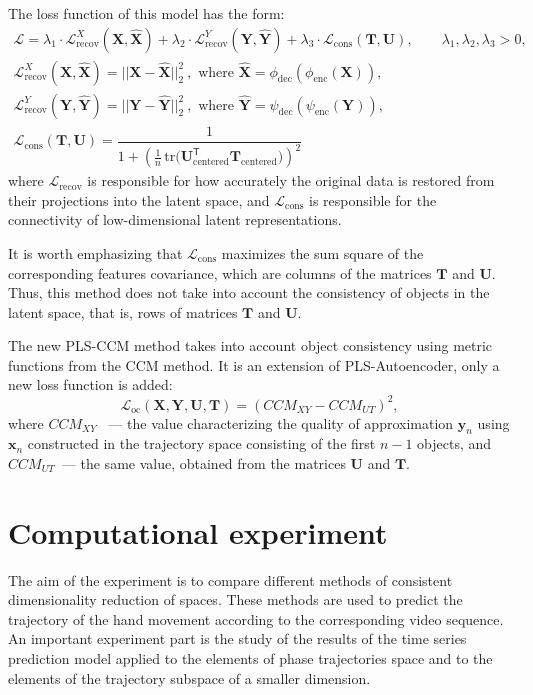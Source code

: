 \documentclass[bst/sn-mathphys]{sn-jnl}%
\newcommand{\bx}{\ensuremath{\mathbf{x}}}
\newcommand{\by}{\mathbf{y}}
\newcommand{\bT}{\mathbf{T}}
\newcommand{\bX}{\mathbf{X}}
\newcommand{\bY}{\mathbf{Y}}
\newcommand{\bU}{\mathbf{U}}
\renewcommand{\T}{^{\mathsf{T}}}
\theoremstyle{thmstyleone}%
\theoremstyle{thmstyletwo}%
\theoremstyle{thmstylethree}%
\begin{document}
The loss function of this model has the form:
\begin{gather*}
	\mathcal{L} = \lambda_1 \cdot \mathcal{L}^X_{\text{recov}}(\bX, \hat{\bX}) + \lambda_2 \cdot \mathcal{L}^Y_{\text{recov}}(\bY, \hat{\bY}) + \lambda_3 \cdot \mathcal{L}_{\text{cons}}(\bT, \bU), 
	\qquad \lambda_1, \lambda_2, \lambda_3 > 0,	\\
	\mathcal{L}^X_{\text{recov}}(\bX, \hat{\bX}) = || \bX - \hat{\bX}||_2^2 \: , \text{ where } \hat{\bX} = \phi_{\text{dec}}(\phi_{\text{enc}}(\bX)), \\
	\mathcal{L}^Y_{\text{recov}}(\bY, \hat{\bY}) = || \bY - \hat{\bY}||_2^2 \: , \text{ where } \hat{\bY} = \psi_{\text{dec}}(\psi_{\text{enc}}(\bY)), \\
	\mathcal{L}_{\text{cons}}(\bT, \bU) = \dfrac{1}{1 + \left( \frac{1}{n} \, \text{tr}\bigl(\bU_{\text{centered}}\T \bT_{\text{centered}} \bigr) \right)^2}
\end{gather*}
where $\mathcal{L}_{\text{recov}}$ is responsible for how accurately the original data is restored from their projections into the latent space, and $\mathcal{L}_{\text{cons}}$ is responsible for the connectivity of low-dimensional latent representations.

It is worth emphasizing that $\mathcal{L}_{\text{cons}}$ maximizes the sum square of the corresponding features covariance, which are columns of the matrices $\bT$ and $\bU$.
Thus, this method does not take into account the consistency of objects in the latent space, that is, rows of matrices $\bT$ and $\bU$.

The new PLS-CCM method takes into account object consistency using metric functions from the CCM method. It is an extension of PLS-Autoencoder, only a new loss function is added:
$$ \mathcal{L}_\text{oc}(\bX, \bY, \bU, \bT) = \left( CCM_{XY} - CCM_{UT} \right)^2 ,$$
where $CCM_{XY}$ ~--- the value characterizing the quality of approximation $\by_n$ using $\bx_n$ constructed in the trajectory space consisting of the first $n-1$ objects, and $CCM_{UT}$~--- the same value, obtained from the matrices $\bU$ and $\bT$.

\section{Computational experiment}
The aim of the experiment is to compare different methods of consistent dimensionality reduction of spaces.
These methods are used to predict the trajectory of the hand movement according to the corresponding video sequence.
An important experiment part is the study of the results of the time series prediction model applied to the elements of phase trajectories space and to the elements of the trajectory subspace of a smaller dimension.
\end{document}
